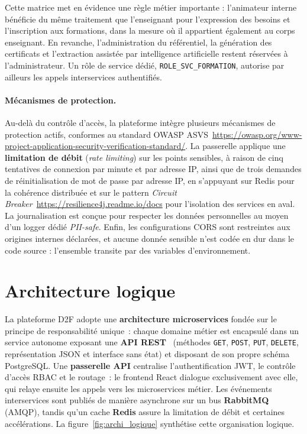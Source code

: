 \documentclass[12pt,a4paper]{report}
\begin{document}
Cette matrice met en évidence une règle métier importante : l'animateur
interne bénéficie du même traitement que l'enseignant pour l'expression
des besoins et l'inscription aux formations, dans la mesure où il
appartient également au corps enseignant. En revanche, l'administration du
référentiel, la génération des certificats et l'extraction assistée par
intelligence artificielle restent réservées à l'administrateur. Un rôle de
service dédié, \texttt{ROLE\_SVC\_FORMATION}, autorise par ailleurs les
appels interservices authentifiés.

\paragraph{Mécanismes de protection.}
Au-delà du contrôle d'accès, la plateforme intègre plusieurs mécanismes de
  protection actifs, conformes au standard OWASP ASVS~\url{https://owasp.org/www-project-application-security-verification-standard/}. La
passerelle applique une \textbf{limitation de débit} (\textit{rate
limiting}) sur les points sensibles, à raison de cinq tentatives de
connexion par minute et par adresse IP, ainsi que de trois demandes de
réinitialisation de mot de passe par adresse IP, en s'appuyant sur Redis
pour la cohérence distribuée et sur le pattern \emph{Circuit
  Breaker}~\url{https://resilience4j.readme.io/docs} pour l'isolation des services en aval.
La journalisation est conçue pour respecter les données personnelles au
moyen d'un logger dédié \textit{PII-safe}. Enfin, les configurations CORS
sont restreintes aux origines internes déclarées, et aucune donnée sensible
n'est codée en dur dans le code source : l'ensemble transite par des
variables d'environnement.

\section{Architecture logique}

La plateforme D2F adopte une \textbf{architecture microservices} fondée sur le
principe de responsabilité unique~: chaque domaine métier est encapsulé dans un
service autonome exposant une \textbf{API REST}~\cite{fielding2000rest} (méthodes
\texttt{GET}, \texttt{POST}, \texttt{PUT}, \texttt{DELETE}, représentation JSON
et interface sans état) et disposant de son propre schéma PostgreSQL. Une
\textbf{passerelle API} centralise l'authentification JWT, le contrôle d'accès
RBAC et le routage~: le frontend React dialogue exclusivement avec elle, qui
relaye ensuite les appels vers les microservices métier. Les événements
interservices sont publiés de manière asynchrone sur un bus
\textbf{RabbitMQ} (AMQP), tandis qu'un cache \textbf{Redis} assure la limitation
de débit et certaines accélérations. La figure~\ref{fig:archi_logique} synthétise
cette organisation logique.
\end{document}
